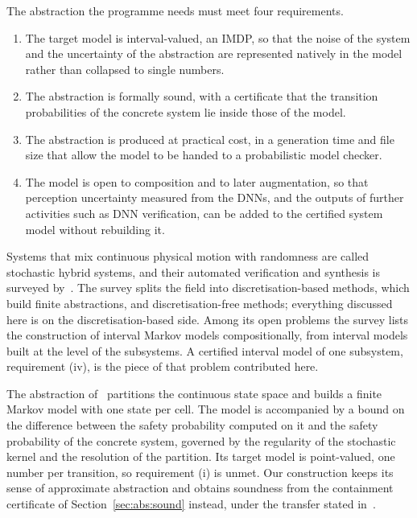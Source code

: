 \documentclass[11pt,a4paper]{article}
\theoremstyle{plain}
\theoremstyle{remark}
\begin{document}
	The abstraction the programme needs must meet four requirements.
	\begin{enumerate}
		\item[(i)] The target model is interval-valued, an IMDP, so that the noise of the system and the uncertainty of the abstraction are represented natively in the model rather than collapsed to single numbers.
		\item[(ii)] The abstraction is formally sound, with a certificate that the transition probabilities of the concrete system lie inside those of the model.
		\item[(iii)] The abstraction is produced at practical cost, in a generation time and file size that allow the model to be handed to a probabilistic model checker.
		\item[(iv)] The model is open to composition and to later augmentation, so that perception uncertainty measured from the DNNs, and the outputs of further activities such as DNN verification, can be added to the certified system model without rebuilding it.
	\end{enumerate}
	
	Systems that mix continuous physical motion with randomness are called stochastic hybrid systems, and their automated verification and synthesis is surveyed by~\cite{LSAZ22}. The survey splits the field into discretisation-based methods, which build finite abstractions, and discretisation-free methods; everything discussed here is on the discretisation-based side. Among its open problems the survey lists the construction of interval Markov models compositionally, from interval models built at the level of the subsystems. A certified interval model of one subsystem, requirement (iv), is the piece of that problem contributed here.
	
	The abstraction of~\cite{ADD11} partitions the continuous state space and builds a finite Markov model with one state per cell. The model is accompanied by a bound on the difference between the safety probability computed on it and the safety probability of the concrete system, governed by the regularity of the stochastic kernel and the resolution of the partition. Its target model is point-valued, one number per transition, so requirement (i) is unmet. Our construction keeps its sense of approximate abstraction and obtains soundness from the containment certificate of Section~\ref{sec:abs:sound} instead, under the transfer stated in~\cite{LAB15}.
	
\end{document}
